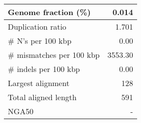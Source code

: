 \documentclass[12pt,a4paper]{article}
\begin{document}
\begin{table}[ht]
\begin{center}
\begin{tabular}{|l*{1}{|r}|}
Genome fraction (\%) & 0.014 \\ \hline
Duplication ratio & 1.701 \\ \hline
\# N's per 100 kbp & 0.00 \\ \hline
\# mismatches per 100 kbp & 3553.30 \\ \hline
\# indels per 100 kbp & 0.00 \\ \hline
Largest alignment & 128 \\ \hline
Total aligned length & 591 \\ \hline
NGA50 & - \\ \hline
\end{tabular}
\end{center}
\end{table}
\end{document}
